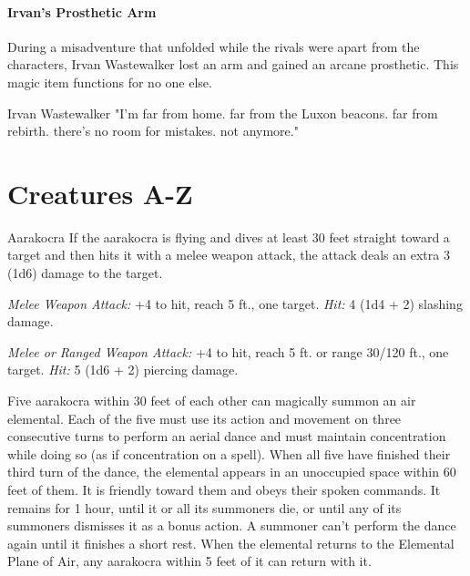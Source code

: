 \documentclass[10pt,a4paper,twoside,twocolumn,openany,nodeprecatedcode]{dndbook}
\begin{document}
\paragraph{Irvan's Prosthetic Arm}
During a misadventure that unfolded while the rivals were apart from the characters, Irvan Wastewalker lost an arm and gained an arcane prosthetic. This magic item functions for no one else.

\begin{DndReadAloud}{Irvan Wastewalker}
"I'm far from home. far from the Luxon beacons. far from rebirth. there's no room for mistakes. not anymore."
\end{DndReadAloud}

\clearpage

\section{Creatures A-Z}


\begin{DndMonster}[float=ht]{Aarakocra}
\DndMonsterBasics[
armor-class = {12},
hit-points = {\DndDice{3d8}},
speed = {20 ft., 50 ft. (key)}
]
\DndMonsterAbilityScores[
 str = 10,
 dex = 14,
 con = 10,
 int = 11,
 wis = 12,
 cha = 11
]
\DndMonsterDetails[
skills = {Perception +5},
languages = {Auran, Aarakocra},
challenge = 1/4,
]
If the aarakocra is flying and dives at least 30 feet straight toward a target and then hits it with a melee weapon attack, the attack deals an extra 3 (1d6) damage to the target.

\par
{}
\textsl{Melee Weapon Attack:} +4 to hit, reach 5 ft., one target. \textsl{Hit:} 4 (1d4 + 2) slashing damage.

\textsl{Melee or Ranged Weapon Attack:} +4 to hit, reach 5 ft. or range 30/120 ft., one target. \textsl{Hit:} 5 (1d6 + 2) piercing damage.

Five aarakocra within 30 feet of each other can magically summon an air elemental. Each of the five must use its action and movement on three consecutive turns to perform an aerial dance and must maintain concentration while doing so (as if concentration on a spell). When all five have finished their third turn of the dance, the elemental appears in an unoccupied space within 60 feet of them. It is friendly toward them and obeys their spoken commands. It remains for 1 hour, until it or all its summoners die, or until any of its summoners dismisses it as a bonus action. A summoner can't perform the dance again until it finishes a short rest. When the elemental returns to the Elemental Plane of Air, any aarakocra within 5 feet of it can return with it.

\end{DndMonster}
\end{document}
